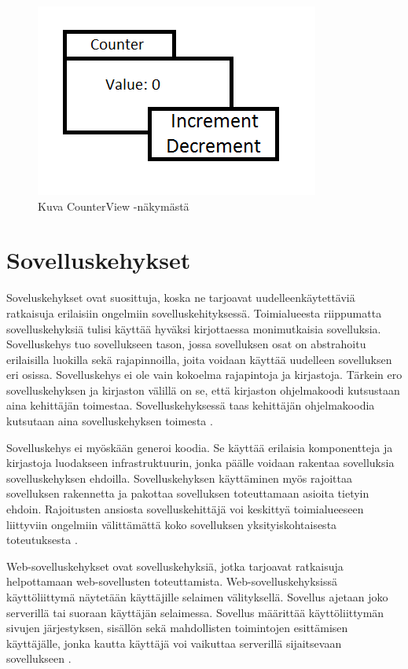 \documentclass[utf8]{gradu3}
\begin{document}
\begin{figure}[h]
\centering
\includegraphics[scale=0.85]{counter.png}
\caption{Kuva CounterView -näkymästä \cite{krasner_desc}}
\end{figure}

\chapter{Sovelluskehykset}
Soveluskehykset ovat suosittuja, koska ne tarjoavat uudelleenkäytettäviä ratkaisuja erilaisiin ongelmiin sovelluskehityksessä. Toimialueesta riippumatta sovelluskehyksiä tulisi käyttää hyväksi kirjottaessa monimutkaisia sovelluksia. Sovelluskehys tuo sovellukseen tason, jossa sovelluksen osat on abstrahoitu erilaisilla luokilla sekä rajapinnoilla, joita voidaan käyttää uudelleen sovelluksen eri osissa. Sovelluskehys ei ole vain kokoelma rajapintoja ja kirjastoja\parencite{towards_framework}. Tärkein ero sovelluskehyksen ja kirjaston välillä on se, että kirjaston ohjelmakoodi kutsustaan aina
kehittäjän toimestaa. Sovelluskehyksessä taas kehittäjän ohjelmakoodia kutsutaan aina sovelluskehyksen toimesta \parencite{pyramid_intr}.

Sovelluskehys ei myöskään generoi koodia. Se käyttää erilaisia komponentteja ja kirjastoja luodakseen infrastruktuurin, jonka päälle voidaan rakentaa sovelluksia sovelluskehyksen ehdoilla. Sovelluskehyksen käyttäminen myös rajoittaa sovelluksen rakennetta ja pakottaa sovelluksen toteuttamaan asioita tietyin ehdoin. Rajoitusten ansiosta sovelluskehittäjä voi keskittyä toimialueeseen liittyviin ongelmiin välittämättä koko sovelluksen yksityiskohtaisesta toteutuksesta \parencite{towards_framework}.

Web-sovelluskehykset ovat sovelluskehyksiä, jotka tarjoavat ratkaisuja helpottamaan web-sovellusten toteuttamista. Web-sovelluskehyksissä käyttöliittymä näytetään käyttäjille selaimen välityksellä. Sovellus ajetaan joko serverillä tai suoraan käyttäjän selaimessa. Sovellus määrittää käyttöliittymän sivujen järjestyksen, sisällön sekä mahdollisten toimintojen esittämisen käyttäjälle, jonka kautta käyttäjä voi vaikuttaa serverillä sijaitsevaan sovellukseen \parencite{vosloo}. 
\end{document}

